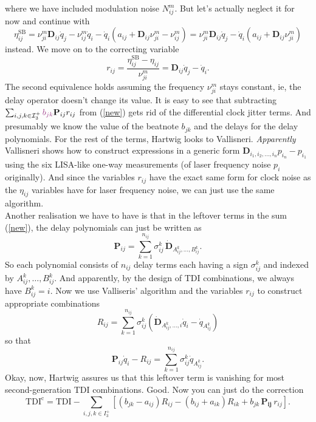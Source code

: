 \documentclass[11pt]{article}
\begin{document}
where we have included modulation noise $N_{ij}^m$. But let's actually neglect it for now and continue with
\begin{equation*}
    \eta^{\text{SB}}_{ij}=\nu_{j i}^{m} \mathbf{D}_{ij} \dot{q}_j
-\nu_{i j}^{m} \dot{q}_i -\dot{q}_i \left( a_{ij} + \mathbf{D}_{ij} \nu_{j i}^{m} - \nu_{i j}^{m} \right)=\nu_{j i}^{m} \mathbf{D}_{ij} \dot{q}_j -\dot{q}_i \left( a_{ij} + \mathbf{D}_{ij} \nu_{j i}^{m} \right)
\end{equation*}
instead. We move on to the correcting variable
\begin{equation}
    r_{ij}=\frac{\eta^{\text{SB}}_{ij}-\eta_{ij}}{\nu_{ji}^m} = \mathbf{D}_{ij} \dot{q}_j-\dot{q}_i. \label{rij}
\end{equation}
The second equivalence holds assuming the frequency $\nu_{ji}^m$ stays constant, ie, the delay operator doesn't change its value. It is easy to see that subtracting $\sum_{i,j,k\in\mathcal{I}^+_3}\color{DarkOrchid}b_{jk}\color{black}\mathbf{P}_{ij}r_{ij}$ from (\ref{new}) gets rid of the differential clock jitter terms. And presumably we know the value of the beatnote $b_{jk}$ and the delays for the delay polynomials. For the rest of the terms, Hartwig looks to Vallisneri. \textit{Apparently} Vallisneri shows how to construct expressions in a generic form $\mathbf{D}_{i_1, i_2,...,i_n}p_{i_n}-p_{i_1}$ using the six LISA-like one-way measurements (of laser frequency noise $p_i$ originally). And since the variables $r_{ij}$ have the exact same form for clock noise as the $\eta_{ij}$ variables have for laser frequency noise, we can just use the same algorithm.\\
Another realisation we have to have is that in the leftover terms in the sum (\ref{new}), the delay polynomials can just be written as 
\begin{equation*}
\mathbf{P}_{ij}=\sum_{k=1}^{n_{ij}}\sigma^{k}_{ij}\,\dot{\mathbf{D}}_{A^{k}_{ij},\ldots,B^{k}_{ij}}.
\end{equation*}
So each polynomial consists of $n_{ij}$ delay terms each having a sign $\sigma^{k}_{ij}$ and indexed by $A^{k}_{ij},\ldots,B^{k}_{ij}$. And apparently, by the design of TDI combinations, we always have $B^{k}_{ij}=i$. Now we use Valliseris' algorithm and the variables $r_{ij}$ to construct appropriate combinations
\begin{equation*}
    R_{ij}=\sum_{k=1}^{n_{ij}}\sigma^{k}_{ij}\left(\dot{\mathbf{D}}_{A^{k}_{ij},\ldots,i}\dot{q}_i-\dot{q}_{A^{k}_{ij}}\right)
\end{equation*}
so that
\begin{equation*}
    \mathbf{P}_{ij}\dot{q}_{i}-R_{ij}=\sum_{k=1}^{n_{ij}}\sigma^{k}_{ij}\dot{q}_{A^{k}_{ij}}.
\end{equation*}
Okay, now, Hartwig assures us that this leftover term is vanishing for most second-generation TDI combinations. Good. Now you can just do the correction
\begin{equation}
\mathrm{TDI}^{\mathrm{c}}
=\mathrm{TDI}-\sum_{i,j,k \in I_3^{+}}
\left[\left(b_{jk}-a_{ij}\right) R_{ij}-\left(b_{ij}+a_{ik}\right) R_{ik}+b_{jk}\,\mathbf{P_{ij}}\,r_{ij}
\right].
\end{equation}
\end{document}

